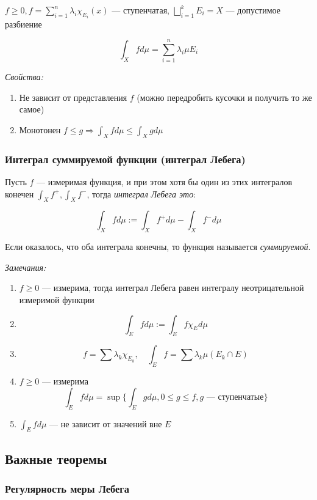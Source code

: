 \documentclass{article}
\begin{document}
$f \ge 0, f = \sum_{i = 1}^{n} \lambda_i \chi_{E_i}(x)$ --- ступенчатая, $\bigsqcup_{i = 1}^{k} E_{i} = X$ --- допустимое разбиение

\[\int_{X} f d \mu = \sum_{i = 1}^{n} \lambda_i \mu E_i \] 

\textit{Свойства: }

\begin{enumerate}
    \item Не зависит от представления $f$ (можно передробить кусочки и получить то же самое)
    \item Монотонен $f \le g \Rightarrow \int_{X} f d \mu \le \int_{X} g d \mu$
\end{enumerate}


\subsubsection{Интеграл суммируемой функции (интеграл Лебега)}

Пусть $f$ --- измеримая функция, и при этом хотя бы один из этих интегралов конечен $\int_{X} f^{+}, \int_{X} f^{-}$, тогда \textit{интеграл Лебега это}:

\[\int_{X} f d \mu := \int_{X} f^{+} d \mu - \int_{X} f^{-} d \mu\]

Если оказалось, что оба интеграла конечны, то функция называется \textit{суммируемой}.

\textit{Замечания: }
\begin{enumerate}
    \item $f \ge 0$ --- измерима, тогда интеграл Лебега равен интегралу неотрицательной измеримой функции
    \item \[\int_{E} f d \mu := \int_{E} f \chi_{E} d \mu\]
    \item \[f = \sum \lambda_{k} \chi_{E_{k}}, \quad \int_{E} f = \sum \lambda_k \mu(E_{k} \cap E)\]
    \item $f \ge 0$ --- измерима
        \[\int_{E} f d \mu = \sup \{\int_{E} g d \mu, 0 \le g \le f, g\text{ --- ступенчатые}\}\]
    \item $\int_{E} f d \mu$ --- не зависит от значений вне $E$
\end{enumerate}

\newpage

\subsection{Важные теоремы}

\subsubsection{Регулярность меры Лебега}
\end{document}
